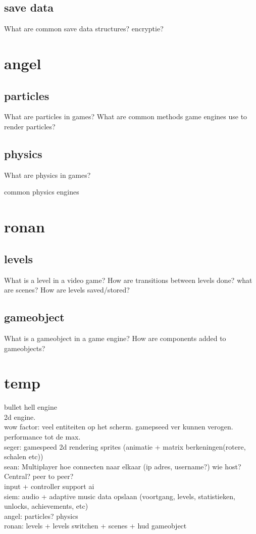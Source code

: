 \documentclass{article} %
\begin{document}
\subsection{save data}
What are common save data structures?
encryptie?
\newpage

\section{angel}
\subsection{particles}
What are particles in games?
What are common methods game engines use to render particles?
\subsection{physics}
What are physics in games?

common physics engines

\newpage

\section{ronan}
\subsection{levels}
What is a level in a video game?
How are transitions between levels done?
what are scenes?
How are levels saved/stored?
\subsection{gameobject}
What is a gameobject in a game engine?
How are components added to gameobjects?

\newpage

\section{temp}
bullet hell engine
\\
2d engine.
\\
wow factor: veel entiteiten op het scherm. gamepseed ver kunnen verogen.
performance tot de max.
\\
seger:
gamespeed
2d rendering
sprites (animatie + matrix berkeningen(rotere, schalen etc))
\\
sean:
Multiplayer
hoe connecten naar elkaar (ip adres, username?)
wie host? Central? peer to peer?
\\
input + controller support
ai
\\
siem:
audio + adaptive music
data opslaan (voortgang, levels, statistieken, unlocks, achievements, etc)
\\
angel:
particles?
physics
\\
ronan:
levels + levels switchen + scenes + hud
gameobject


\newpage
\end{document}
